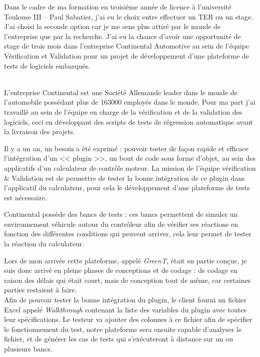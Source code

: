 \documentclass[a4paper, 12pt]{article}
\begin{document}
	\maketitle
	Dans le cadre de ma formation en troisième année de licence à l'université Toulouse III -- Paul Sabatier, j'ai eu le choix entre effectuer un TER ou un
	stage.  J'ai choisi la seconde option car je me sens plus attiré par le monde de l'entreprise que par la recherche. J'ai eu la chance d’avoir une opportunité de stage de trois mois dans l'entreprise Continental Automotive au sein de l'équipe Vérification et Validation pour un projet de développement
	d'une plateforme de tests de logiciels embarqués.\\~

	L'entreprise Continental est une Société Allemande leader dans le monde de l'automobile possédant plus de 163000 employés dans le monde. Pour ma part j'ai travaillé au
	sein de l'équipe en charge de la vérification et de la validation des logiciels, ceci en développant des scripts de tests de régression automatique avant la
	livraison des projets.

	Il y a un an, un besoin a été exprimé : pouvoir tester de façon rapide et efficace l'intégration d'un << plugin >>, un bout de code sous forme
	d'objet,  au sein des applicatifs d'un calculateur de contrôle moteur. La mission de l'équipe vérification \& Validation est de permettre de tester la bonne intégration
	de ce plugin dans l'applicatif du calculateur, pour cela le développement d'une plateforme de tests est nécessaire.

	Continental possède des bancs de tests : ces bancs permettent de simuler un environnement véhicule autour du
	contrôleur afin de vérifier ses réactions en fonction des différentes conditions qui peuvent arriver, cela leur permet de tester la réaction du calculateur.

	Lors de mon arrivée cette plateforme, appelé \textit{GreenT}, était en partie conçue, je suis donc arrivé en pleine phases de conceptions et de codage : de
	codage en raison des délais qui était court, mais de conception tout de même, car certaines parties restaient à faire.\\
	Afin de pouvoir tester la bonne intégration du plugin, le client fourni un fichier Excel appelé \textit{Walkthrough} contenant la liste des variables du plugin avec
	toutes leur spécifications. Le testeur va ajouter des colonnes à ce fichier afin de spécifier le fonctionnement du test, notre plateforme sera ensuite
	capable d'analyser le fichier, et de générer les cas de tests qui s'exécuteront à distance sur un ou plusieurs bancs.
\end{document}
